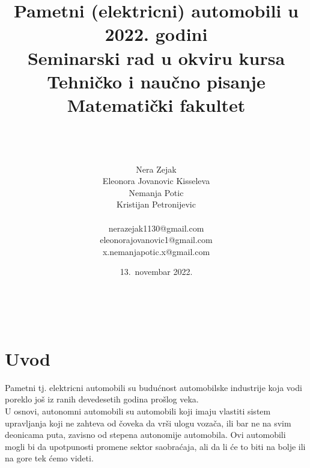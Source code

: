 \documentclass[a4paper]{article}
\begin{document}
\title{Pametni (elektricni) automobili u 2022. godini\vspace{3ex}\\
\small{Seminarski rad u okviru kursa\\
Tehničko i naučno pisanje\\
Matematički fakultet}\vspace{3ex}}
\author{\\\\\\Nera Zejak\\Eleonora Jovanovic Kisseleva\\Nemanja Potic\\Kristijan Petronijevic \\ \\nerazejak1130@gmail.com\\eleonorajovanovic1@gmail.com\\x.nemanjapotic.x@gmail.com\\}
\date{13.~novembar 2022.}\
\maketitle

\maketitle

 
\tableofcontents
\newpage

\section{Uvod}
\label{sec:uvod}
Pametni tj. elektricni automobili su budućnost automobilske industrije koja vodi poreklo još iz ranih devedesetih godina prošlog veka. 
\\U osnovi, autonomni automobili su automobili koji imaju vlastiti sistem upravljanja koji ne zahteva od čoveka da vrši ulogu vozača, ili bar ne na svim deonicama puta, zavisno od stepena autonomije automobila. Ovi automobili mogli bi da upotpunosti promene sektor saobraćaja, ali da li će to biti na bolje ili na gore tek ćemo videti.
\end{document}
